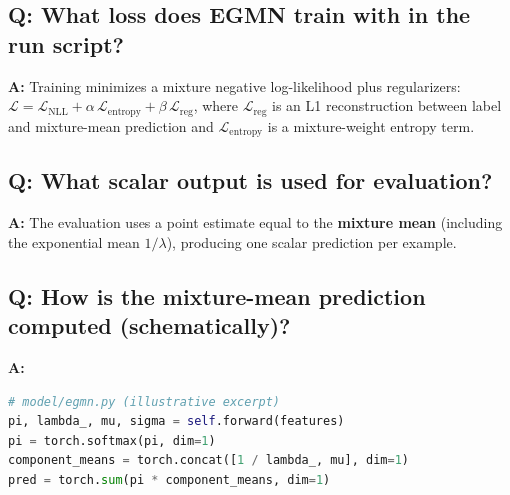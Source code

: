 \subsection{Q: What loss does EGMN train with in the run script?}
\noindent\textbf{A:} Training minimizes a mixture negative log-likelihood plus regularizers: \(\mathcal{L}=\mathcal{L}_{\mathrm{NLL}}+\alpha\,\mathcal{L}_{\mathrm{entropy}}+\beta\,\mathcal{L}_{\mathrm{reg}}\), where \(\mathcal{L}_{\mathrm{reg}}\) is an L1 reconstruction between label and mixture-mean prediction and \(\mathcal{L}_{\mathrm{entropy}}\) is a mixture-weight entropy term.

\subsection{Q: What scalar output is used for evaluation?}
\noindent\textbf{A:} The evaluation uses a point estimate equal to the \textbf{mixture mean} (including the exponential mean \(1/\lambda\)), producing one scalar prediction per example.

\subsection{Q: How is the mixture-mean prediction computed (schematically)?}
\noindent\textbf{A:}
\begin{lstlisting}[language=Python]
# model/egmn.py (illustrative excerpt)
pi, lambda_, mu, sigma = self.forward(features)
pi = torch.softmax(pi, dim=1)
component_means = torch.concat([1 / lambda_, mu], dim=1)
pred = torch.sum(pi * component_means, dim=1)
\end{lstlisting}

